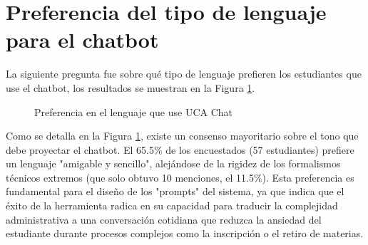 {{\section{Preferencia del tipo de lenguaje para el chatbot}
La siguiente pregunta fue sobre qué tipo de lenguaje prefieren los estudiantes que use el chatbot, los resultados se muestran en la Figura \ref{fig:preferencia_lenguaje}.

\begin{figure}[H]
    \centering
    \caption{Preferencia en el lenguaje que use UCA Chat}
    \label{fig:preferencia_lenguaje}
\end{figure}

Como se detalla en la Figura \ref{fig:preferencia_lenguaje}, existe un consenso mayoritario sobre el tono que debe proyectar el chatbot. El 65.5\% de los encuestados (57 estudiantes) prefiere un lenguaje "amigable y sencillo", alejándose de la rigidez de los formalismos técnicos extremos (que solo obtuvo 10 menciones, el 11.5\%). Esta preferencia es fundamental para el diseño de los "prompts" del sistema, ya que indica que el éxito de la herramienta radica en su capacidad para traducir la complejidad administrativa a una conversación cotidiana que reduzca la ansiedad del estudiante durante procesos complejos como la inscripción o el retiro de materias.

}}
